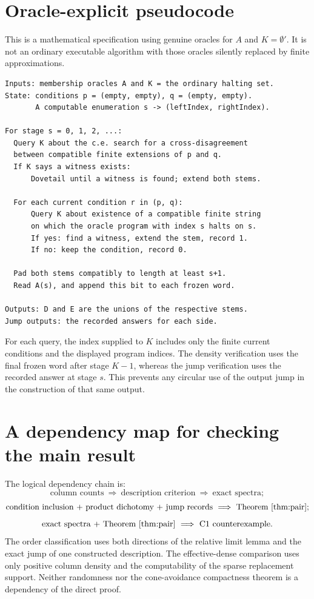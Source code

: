 \documentclass[11pt,a4paper]{article}
\theoremstyle{definition}\newtheorem{definition}[theorem]{Definition}
\theoremstyle{remark}\newtheorem{remark}[theorem]{Remark}
\begin{document}
\section{Oracle-explicit pseudocode}
\label{app:pseudocode}
This is a mathematical specification using genuine oracles for $A$ and $K=\emptyset'$. It is not an ordinary executable algorithm with those oracles silently replaced by finite approximations.
\begin{lstlisting}
Inputs: membership oracles A and K = the ordinary halting set.
State: conditions p = (empty, empty), q = (empty, empty).
       A computable enumeration s -> (leftIndex, rightIndex).

For stage s = 0, 1, 2, ...:
  Query K about the c.e. search for a cross-disagreement
  between compatible finite extensions of p and q.
  If K says a witness exists:
      Dovetail until a witness is found; extend both stems.

  For each current condition r in (p, q):
      Query K about existence of a compatible finite string
      on which the oracle program with index s halts on s.
      If yes: find a witness, extend the stem, record 1.
      If no: keep the condition, record 0.

  Pad both stems compatibly to length at least s+1.
  Read A(s), and append this bit to each frozen word.

Outputs: D and E are the unions of the respective stems.
Jump outputs: the recorded answers for each side.
\end{lstlisting}
For each query, the index supplied to $K$ includes only the finite current conditions and the displayed program indices. The density verification uses the final frozen word after stage $K-1$, whereas the jump verification uses the recorded answer at stage $s$. This prevents any circular use of the output jump in the construction of that same output.

\section{A dependency map for checking the main result}
The logical dependency chain is:
\[
 \text{column counts}\ \Longrightarrow\
 \text{description criterion}\ \Longrightarrow\
 \text{exact spectra};
\]
\[
 \text{condition inclusion + product dichotomy + jump records}
 \ \Longrightarrow\ \text{Theorem~\ref{thm:pair}};
\]
\[
 \text{exact spectra + Theorem~\ref{thm:pair}}
 \ \Longrightarrow\ \text{C1 counterexample}.
\]
The order classification uses both directions of the relative limit lemma and the exact jump of one constructed description. The effective-dense comparison uses only positive column density and the computability of the sparse replacement support. Neither randomness nor the cone-avoidance compactness theorem is a dependency of the direct proof.
\end{document}
